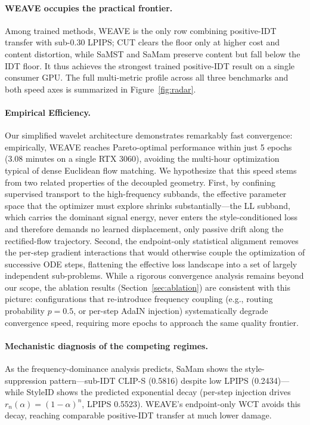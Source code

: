 \documentclass[letterpaper]{article}
\begin{document}
\paragraph{WEAVE occupies the practical frontier.}
Among trained methods, WEAVE is the only row combining positive-IDT transfer with sub-0.30 LPIPS; CUT clears the floor only at higher cost and content distortion, while SaMST and SaMam preserve content but fall below the IDT floor.
It thus achieves the strongest trained positive-IDT result on a single consumer GPU.
The full multi-metric profile across all three benchmarks and both speed axes is summarized in Figure~\ref{fig:radar}.

\paragraph{Empirical Efficiency.}
Our simplified wavelet architecture demonstrates remarkably fast convergence: empirically, WEAVE reaches Pareto-optimal performance within just 5 epochs (3.08 minutes on a single RTX 3060), avoiding the multi-hour optimization typical of dense Euclidean flow matching.
We hypothesize that this speed stems from two related properties of the decoupled geometry.
First, by confining supervised transport to the high-frequency subbands, the effective parameter space that the optimizer must explore shrinks substantially---the LL subband, which carries the dominant signal energy, never enters the style-conditioned loss and therefore demands no learned displacement, only passive drift along the rectified-flow trajectory.
Second, the endpoint-only statistical alignment removes the per-step gradient interactions that would otherwise couple the optimization of successive ODE steps, flattening the effective loss landscape into a set of largely independent sub-problems.
While a rigorous convergence analysis remains beyond our scope, the ablation results (Section~\ref{sec:ablation}) are consistent with this picture: configurations that re-introduce frequency coupling (e.g., routing probability $p{=}0.5$, or per-step AdaIN injection) systematically degrade convergence speed, requiring more epochs to approach the same quality frontier.



\paragraph{Mechanistic diagnosis of the competing regimes.}
As the frequency-dominance analysis predicts, SaMam shows the style-suppression pattern---sub-IDT CLIP-S (0.5816) despite low LPIPS (0.2434)---while StyleID shows the predicted exponential decay (per-step injection drives $r_n(\alpha)=(1-\alpha)^n$, LPIPS 0.5523).
WEAVE's endpoint-only WCT avoids this decay, reaching comparable positive-IDT transfer at much lower damage.
\end{document}
